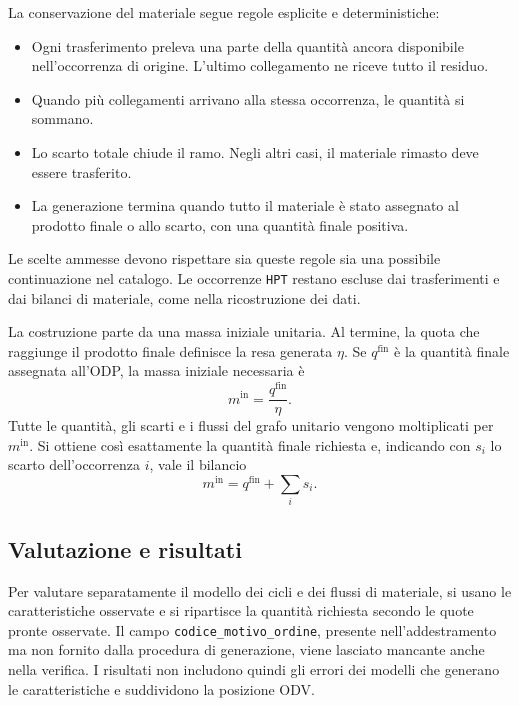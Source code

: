 \begin{samepage}
La conservazione del materiale segue regole esplicite e deterministiche:
\begin{itemize}
\item Ogni trasferimento preleva una parte della quantità ancora disponibile nell'occorrenza di origine. L'ultimo collegamento ne riceve tutto il residuo.
\item Quando più collegamenti arrivano alla stessa occorrenza, le quantità si sommano.
\item Lo scarto totale chiude il ramo. Negli altri casi, il materiale rimasto deve essere trasferito.
\item La generazione termina quando tutto il materiale è stato assegnato al prodotto finale o allo scarto, con una quantità finale positiva.
\end{itemize}
\end{samepage}
Le scelte ammesse devono rispettare sia queste regole sia una possibile continuazione nel catalogo. Le occorrenze \texttt{HPT} restano escluse dai trasferimenti e dai bilanci di materiale, come nella ricostruzione dei dati.

La costruzione parte da una massa iniziale unitaria. Al termine, la quota che raggiunge il prodotto finale definisce la resa generata $\eta$. Se $q^{\mathrm{fin}}$ è la quantità finale assegnata all'ODP, la massa iniziale necessaria è
\begin{equation}
\label{eq:generated-root-mass}
m^{\mathrm{in}}=\frac{q^{\mathrm{fin}}}{\eta}.
\end{equation}
Tutte le quantità, gli scarti e i flussi del grafo unitario vengono moltiplicati per $m^{\mathrm{in}}$. Si ottiene così esattamente la quantità finale richiesta e, indicando con $s_i$ lo scarto dell'occorrenza $i$, vale il bilancio
\begin{equation}
\label{eq:generated-global-balance}
m^{\mathrm{in}}=q^{\mathrm{fin}}+\sum_i s_i.
\end{equation}

\subsection{Valutazione e risultati}
\label{sec:graph-generation-results}

Per valutare separatamente il modello dei cicli e dei flussi di materiale, si usano le caratteristiche osservate e si ripartisce la quantità richiesta secondo le quote pronte osservate. Il campo \texttt{codice\_motivo\_ordine}, presente nell'addestramento ma non fornito dalla procedura di generazione, viene lasciato mancante anche nella verifica. I risultati non includono quindi gli errori dei modelli che generano le caratteristiche e suddividono la posizione ODV.

